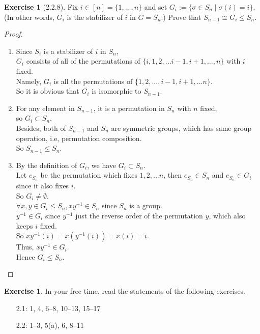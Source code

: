 \documentclass{amsart}
\theoremstyle{plain}
\theoremstyle{definition}
\newtheorem{exer}[lem]{Exercise}
\begin{document}
\begin{exer}[2.2.8]
Fix $i\in [n]=\{1,\ldots,n\}$ and set 
$G_i:=\{\sigma\in S_n\mid\sigma(i)=i\}$.
(In other words, $G_i$ is the stabilizer of $i$ in $G=S_n$.)
Prove that $S_{n-1}\cong G_i\leq S_n$.
\begin{proof}
	$ $\newline
	\begin{enumerate}
		\item
		Since $S_i$ is a stabilizer of $i$ in $S_n$, \\
		$G_i$ consists of all of the permutations of $\{i,1,2,...i-1,i+1,...,n\}$ with $i$ fixed. \\
		Namely, $G_i$ is all the permutations of $\{1,2,...,i-1,i+1,...n\}$.\\
		So it is obvious that $G_i$ is isomorphic to $S_{n-1}$.
		\item
	    For any element in $S_{n-1}$, it is a permutation in $S_n$ with $n$ fixed, \\
		so $G_i \subset S_n$.\\
		Besides, both of $S_{n-1}$ and $S_n$ are symmetric groups, which has same group operation, i.e, permutation composition.\\
		So $S_{n-1} \leq S_n$. \\
		\item
		By the definition of $G_i$, we have $G_i \subset S_n$.\\
		Let $e_{S_n}$ be the permutation which fixes $1,2,...n$, then $e_{S_n} \in S_{n}$ and $e_{S_n} \in G_{i}$ since it also fixes $i$.\\
		So $G_i \neq \emptyset$. \\
		$\forall x,y \in G_i \leq S_n, xy^{-1} \in S_n$ since $S_n$ is a group.\\
		$y^{-1} \in G_i$ since $y^{-1}$ just the reverse order of the permutation $y$, which also keeps $i$ fixed. \\
		So $xy^{-1}(i) = x(y^{-1}(i)) = x(i) = i$. \\
		Thus, $xy^{-1} \in G_i$.\\
		Hence $G_i \leq S_n$.

	\end{enumerate}
	

\end{proof}




\end{exer}

\begin{exer}
In your free time, read the statements of the following exercises.
\begin{enumerate}[1.2:]
\item[2.1:] 1, 4, 6--8, 10--13, 15--17
\item[2.2:] 1--3, 5(a), 6, 8--11
\end{enumerate}
\end{exer}
\end{document}
